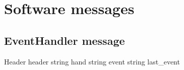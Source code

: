 \section{Software messages}
\label{software_messages}


\subsection{EventHandler message}
Header header
string hand
string event
string last_event

\subsection{}